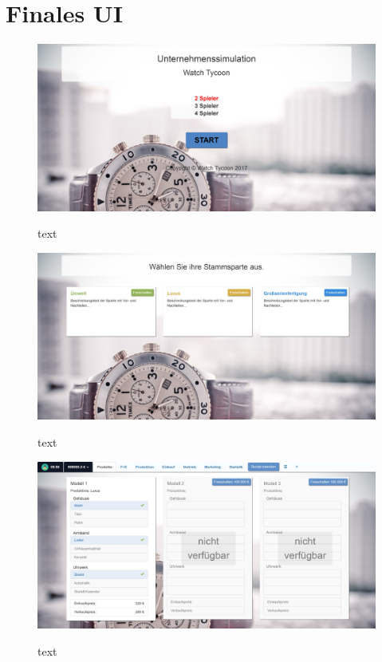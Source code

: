 \section{Finales UI}
\begin{figure} [h]
	\centering
	\includegraphics[scale=0.1]{img/bilder_layout/Spiel1.jpg}
	\label{key}
	\caption{text} 
\end{figure}
\begin{figure} [h]
	\centering
	\includegraphics[scale=0.1]{img/bilder_layout/Spiel2.jpg}
	\label{key}
	\caption{text} 
\end{figure}
\begin{figure} 
	\centering
	\includegraphics[scale=0.1]{img/bilder_layout/Spiel3.jpg}
	\label{key}
	\caption{text} 
\end{figure}
